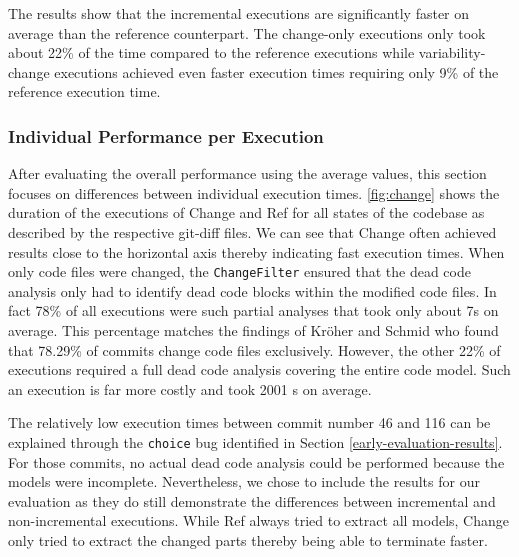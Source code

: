 \documentclass[a4paper]{article}
\begin{document}
The results show that the incremental executions are significantly faster on average than the reference counterpart. The change-only executions only took about 22\% of the time compared to the reference executions while variability-change executions achieved even faster execution times requiring only 9\% of the reference execution time.

\subsubsection{Individual Performance per Execution}\label{individual-performance}

After evaluating the overall performance using the average values, this section focuses on differences between individual execution times. \autoref{fig:change} shows the duration of the executions of \textcolor{orange!80!black}{Change} and \textcolor{gray!80!black}{Ref} for all states of the codebase as described by the respective git-diff files. We can see that Change often achieved results close to the horizontal axis thereby indicating fast execution times. When only code files were changed, the \texttt{ChangeFilter} ensured that the dead code analysis only had to identify dead code blocks within the modified code files. In fact 78\% of all executions were such partial analyses that took only about 7s on average. This percentage matches the findings of Kr\"oher and Schmid \cite{ComAn} who found that 78.29\% of commits change code files exclusively. However, the other 22\% of executions required a full dead code analysis covering the entire code model. Such an execution is far more costly and took 2001 s on average. 

The relatively low execution times between commit number 46 and 116 can be explained through the \texttt{choice} bug identified in Section \ref{early-evaluation-results}. For those commits, no actual dead code analysis could be performed because the models were incomplete. Nevertheless, we chose to include the results for our evaluation as they do still demonstrate the differences between incremental and non-incremental executions. While Ref always tried to extract all models, Change only tried to extract the changed parts thereby being able to terminate faster. 
\end{document}
